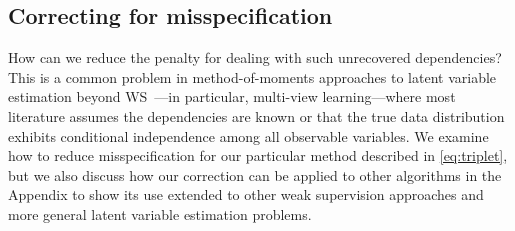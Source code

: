 
\subsection{Correcting for misspecification}\label{sec:misspec}

How can we reduce the penalty for dealing with such unrecovered dependencies? This is a common problem in method-of-moments approaches to latent variable estimation beyond WS~\citep{anandkumar12, chaganty2014estimating}---in particular, multi-view learning---where most literature assumes the dependencies are known or that the true data distribution exhibits conditional independence among all observable variables. We examine how to reduce misspecification for our particular method described in \eqref{eq:triplet}, but we also discuss how our correction can be applied to other algorithms in the Appendix to show its use extended to other weak supervision approaches and more general latent variable estimation problems.


